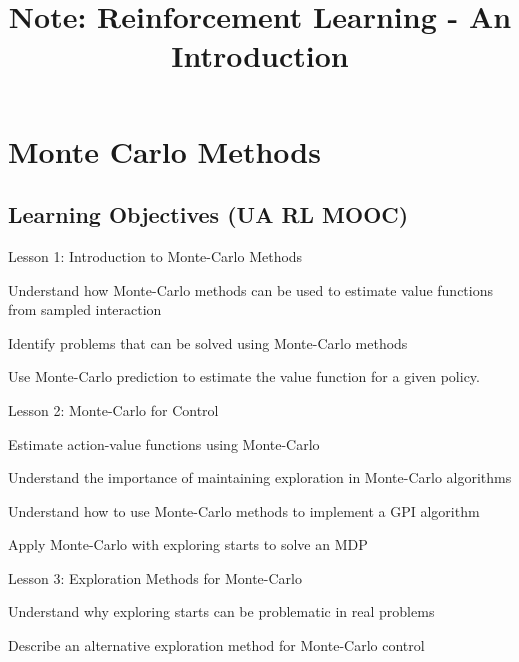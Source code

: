 \documentclass[lang=en,mode=geye,device=normal,color=blue,14pt]{elegantnote}
\title{Note: Reinforcement Learning - An Introduction}
\DeclareMathOperator*{\1}{\mathbbm{1}}
\begin{document}
\maketitle

\setlength{\parindent}{0pt}















\newpage
\section{Monte Carlo Methods}

\subsection{Learning Objectives (UA RL MOOC)}

Lesson 1: Introduction to Monte-Carlo Methods 

Understand how Monte-Carlo methods can be used to estimate value functions from sampled interaction 

Identify problems that can be solved using Monte-Carlo methods 

Use Monte-Carlo prediction to estimate the value function for a given policy. 

Lesson 2: Monte-Carlo for Control 

Estimate action-value functions using Monte-Carlo 

Understand the importance of maintaining exploration in Monte-Carlo algorithms 

Understand how to use Monte-Carlo methods to implement a GPI algorithm

Apply Monte-Carlo with exploring starts to solve an MDP 

Lesson 3: Exploration Methods for Monte-Carlo 

Understand why exploring starts can be problematic in real problems 

Describe an alternative exploration method for Monte-Carlo control 
\end{document}
